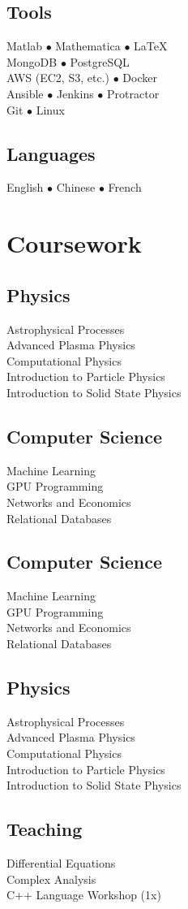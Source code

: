 \documentclass[]{yubo-resume-openfont}
\begin{document}
\begin{minipage}[t]{0.33\textwidth}
    \subsection{Tools}
    Matlab $\bullet$ Mathematica $\bullet$ \LaTeX\\
    MongoDB $\bullet$ PostgreSQL \\
    AWS (EC2, S3, etc.) $\bullet$ Docker\\
    Ansible $\bullet$ Jenkins $\bullet$ Protractor\\
    Git $\bullet$ Linux\\
    \sectionsep
    \subsection{Languages}
    English $\bullet$ Chinese $\bullet$ French
    \sectionsep




\def\PhWork{
    \subsection{Physics}
        Astrophysical Processes\\
        Advanced Plasma Physics\\
        Computational Physics\\
        Introduction to Particle Physics\\
        Introduction to Solid State Physics\\
}
\def\CSWork{
    \subsection{Computer Science}
        Machine Learning\\
        GPU Programming\\
        Networks and Economics\\
        Relational Databases
}

\section{Coursework}
    \ifisCS
        \PhWork
        \sectionsep
        \CSWork
    \else
        \CSWork
        \sectionsep
        \PhWork
    \fi
    \sectionsep

    \subsection{Teaching}
        Differential Equations\\
        Complex Analysis\\
        C++ Language Workshop (1x)
    \sectionsep

%
%

\end{minipage}
\end{document}
